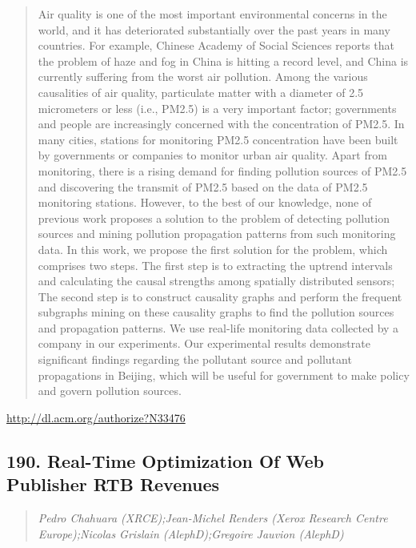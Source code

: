 \documentclass{article}
\begin{document}
\begin{quote}
Air quality is one of the most important environmental concerns in the world, and it has deteriorated substantially over the past years in many countries. For example, Chinese Academy of Social Sciences reports that the problem of haze and fog in China is hitting a record level, and China is currently suffering from the worst air pollution. Among the various causalities of air quality, particulate matter with a diameter of 2.5 micrometers or less (i.e., PM2.5) is a very important factor; governments and people are increasingly concerned with the concentration of PM2.5. In many cities, stations for monitoring PM2.5 concentration have been built by governments or companies to monitor urban air quality. Apart from monitoring, there is a rising demand for finding pollution sources of PM2.5 and discovering the transmit of PM2.5 based on the data of PM2.5 monitoring stations. However, to the best of our knowledge, none of previous work proposes a solution to the problem of detecting pollution sources and mining pollution propagation patterns from such monitoring data. In this work, we propose the first solution for the problem, which comprises two steps. The first step is to extracting the uptrend intervals and calculating the causal strengths among spatially distributed sensors; The second step is to construct causality graphs and perform the frequent subgraphs mining on these causality graphs to find the pollution sources and propagation patterns. We use real-life monitoring data collected by a company in our experiments. Our experimental results demonstrate significant findings regarding the pollutant source and pollutant propagations in Beijing, which will be useful for government to make policy and govern pollution sources.
\end{quote}

\href{http://dl.acm.org/authorize?N33476}{http://dl.acm.org/authorize?N33476}

\subsection{190. Real-Time Optimization Of Web Publisher RTB Revenues}

\begin{quote}
\footnotesize{\textit{Pedro Chahuara (XRCE);Jean-Michel Renders (Xerox Research Centre Europe);Nicolas Grislain (AlephD);Gregoire Jauvion (AlephD)}}

\end{quote}
\end{document}
